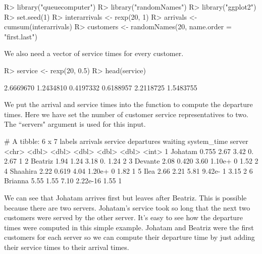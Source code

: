 \documentclass[article]{jss}
\begin{document}
\begin{CodeChunk}
\begin{Sinput}
R> library("queuecomputer")
R> library("randomNames") 
R> library("ggplot2")
R> set.seed(1) 
R> interarrivals <- rexp(20, 1)
R> arrivals <- cumsum(interarrivals)
R> customers <- randomNames(20, name.order = "first.last")
\end{Sinput}
\end{CodeChunk}

We also need a vector of service times for every customer.

\begin{CodeChunk}
\begin{Sinput}
R> service <- rexp(20, 0.5)
R> head(service)
\end{Sinput}
\begin{Soutput}
[1] 2.6669670 1.2434810 0.4197332 0.6188957 2.2118725 1.5483755
\end{Soutput}
\end{CodeChunk}

We put the arrival and service times into the  function to compute the departure times. Here we have set the number of customer service representatives to two. The ``servers" argument is used for this input. 

\begin{CodeChunk}
\begin{Soutput}
# A tibble: 6 x 7
  labels   arrivals service departures  waiting system_time server
  <chr>       <dbl>   <dbl>      <dbl>    <dbl>       <dbl>  <int>
1 Johatam     0.755   2.67        3.42 0.              2.67      1
2 Beatriz     1.94    1.24        3.18 0.              1.24      2
3 Devante     2.08    0.420       3.60 1.10e+ 0        1.52      2
4 Shaahira    2.22    0.619       4.04 1.20e+ 0        1.82      1
5 Ilea        2.66    2.21        5.81 9.42e- 1        3.15      2
6 Brianna     5.55    1.55        7.10 2.22e-16        1.55      1
\end{Soutput}
\end{CodeChunk}

We can see that Johatam arrives first but leaves after Beatriz. This is possible because there are two servers. Johatam's service took so long that the next two customers were served by the other server. It's easy to see how the departure times were computed in this simple example. Johatam and Beatriz were the first customers for each server so we can compute their departure time by just adding their service times to their arrival times.
\end{document}
